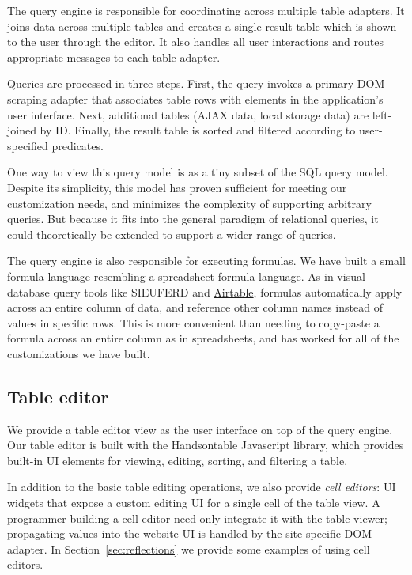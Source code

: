 \documentclass[sigplan,screen,10pt,anonymous,review]{acmart}
\begin{document}
The query engine is responsible for coordinating across multiple table
adapters. It joins data across multiple tables and creates a single
result table which is shown to the user through the editor. It also
handles all user interactions and routes appropriate messages to each
table adapter.

Queries are processed in three steps. First, the query invokes a primary
DOM scraping adapter that associates table rows with elements in the
application's user interface. Next, additional tables (AJAX data, local
storage data) are left-joined by ID. Finally, the result table is sorted
and filtered according to user-specified predicates.

One way to view this query model is as a tiny subset of the SQL query
model. Despite its simplicity, this model has proven sufficient for
meeting our customization needs, and minimizes the complexity of
supporting arbitrary queries. But because it fits into the general
paradigm of relational queries, it could theoretically be extended to
support a wider range of queries.

The query engine is also responsible for executing formulas. We have
built a small formula language resembling a spreadsheet formula
language. As in visual database query tools like SIEUFERD
\citep{bakke2016} and \href{https://airtable.com/}{Airtable}, formulas
automatically apply across an entire column of data, and reference other
column names instead of values in specific rows. This is more convenient
than needing to copy-paste a formula across an entire column as in
spreadsheets, and has worked for all of the customizations we have
built.

\hypertarget{table-editor}{%
\subsection{Table editor}\label{table-editor}}

We provide a table editor view as the user interface on top of the query
engine. Our table editor is built with the Handsontable Javascript
library, which provides built-in UI elements for viewing, editing,
sorting, and filtering a table.

In addition to the basic table editing operations, we also provide
\emph{cell editors}: UI widgets that expose a custom editing UI for a
single cell of the table view. A programmer building a cell editor need
only integrate it with the table viewer; propagating values into the
website UI is handled by the site-specific DOM adapter. In
Section~\ref{sec:reflections} we provide some examples of using cell
editors.
\end{document}
